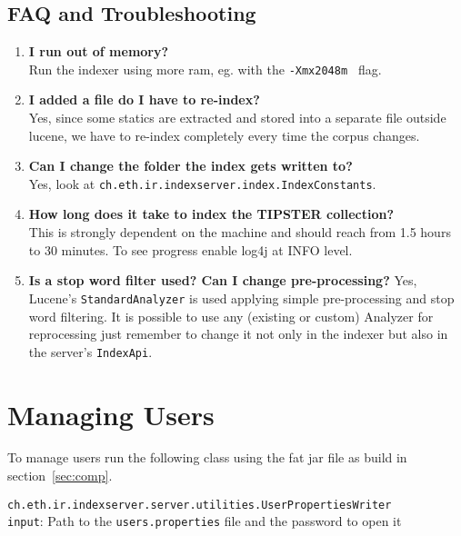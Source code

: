 \documentclass[a4paper,11pt]{article}
\begin{document}
\subsection{FAQ and Troubleshooting}
\begin{enumerate}
\item \textbf{I run out of memory?}\\ Run the indexer using more ram, eg. with the \texttt{-Xmx2048m } flag.
\item \textbf{I added a file do I have to re-index?}\\ Yes, since some statics are extracted and stored into a separate file outside lucene, we have to re-index completely every time the corpus changes.
\item \textbf{Can I change the folder the index gets written to?}\\ Yes, look at \texttt{ch.eth.ir.indexserver.index.IndexConstants}.
\item \textbf{How long does it take to index the TIPSTER collection?}\\ This is strongly dependent on the machine and should reach from 1.5 hours to 30 minutes. To see progress enable log4j at INFO level.
\item \textbf{Is a stop word filter used? Can I change pre-processing?} Yes, Lucene's \texttt{StandardAnalyzer} is used applying simple pre-processing and stop word filtering. It is possible to use any (existing or custom) Analyzer for reprocessing just remember to change it not only in the indexer but also in the server's \texttt{IndexApi}.
\end{enumerate}

\section{Managing Users}
To manage users run the following class using the fat jar file as build in section~\ref{sec:comp}.
\begin{leftbar}
\texttt{ch.eth.ir.indexserver.server.utilities.UserPropertiesWriter}\\
\texttt{input}: Path to the \texttt{users.properties} file and the password to open it
\end{leftbar}
\end{document}
